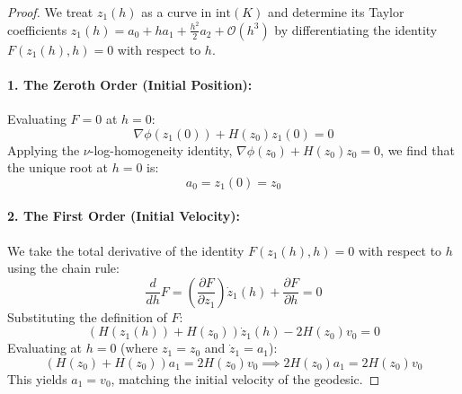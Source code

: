 \documentclass[11pt,a4paper]{article}
\begin{document}
\begin{proof}
We treat $z_1(h)$ as a curve in $\text{int}(K)$ and determine its Taylor coefficients $z_1(h) = a_0 + h a_1 + \frac{h^2}{2} a_2 + \mathcal{O}(h^3)$ by differentiating the identity $F(z_1(h), h) = 0$ with respect to $h$.

\paragraph{1. The Zeroth Order (Initial Position):}
Evaluating $F=0$ at $h=0$:
\begin{equation}
    \nabla \phi(z_1(0)) + H(z_0)z_1(0) = 0
\end{equation}
Applying the $\nu$-log-homogeneity identity, $\nabla \phi(z_0) + H(z_0)z_0 = 0$, we find that the unique root at $h=0$ is:
\begin{equation}
    a_0 = z_1(0) = z_0
\end{equation}

\paragraph{2. The First Order (Initial Velocity):}
We take the total derivative of the identity $F(z_1(h), h) = 0$ with respect to $h$ using the chain rule:
\begin{equation}
    \frac{d}{dh} F = \left( \frac{\partial F}{\partial z_1} \right) \dot{z}_1(h) + \frac{\partial F}{\partial h} = 0
\end{equation}
Substituting the definition of $F$:
\begin{equation}
    (H(z_1(h)) + H(z_0)) \dot{z}_1(h) - 2H(z_0)v_0 = 0
\end{equation}
Evaluating at $h=0$ (where $z_1 = z_0$ and $\dot{z}_1 = a_1$):
\begin{equation}
    (H(z_0) + H(z_0)) a_1 = 2H(z_0)v_0 \implies 2H(z_0) a_1 = 2H(z_0)v_0
\end{equation}
This yields $a_1 = v_0$, matching the initial velocity of the geodesic.


\end{proof}
\end{document}
